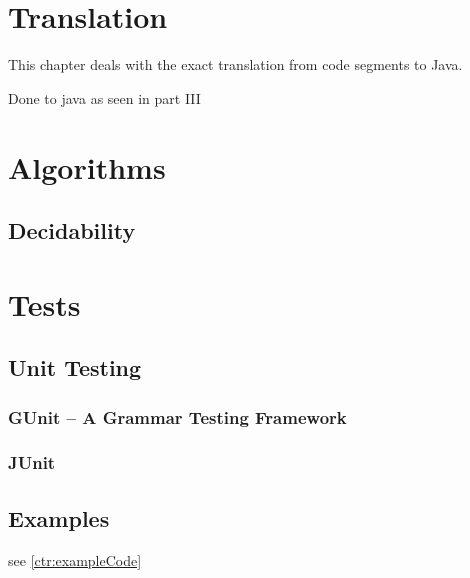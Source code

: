 \section{Translation}
\label{ctr:translation}
This chapter deals with the exact translation from \ooplss code segments
to Java.

Done to java as seen in part III


\section{Algorithms}

\subsection{Decidability}

\section{Tests}
\subsection{Unit Testing}
\subsubsection{GUnit -- A Grammar Testing Framework}
\subsubsection{JUnit}

\subsection{Examples}
see \cref{ctr:exampleCode}
